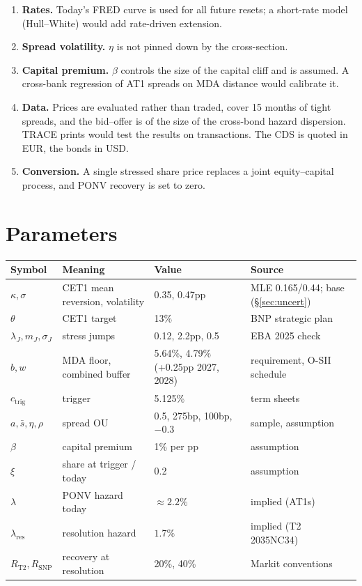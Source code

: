 \documentclass[11pt]{article}
\newcommand{\1}{\mathbf{1}}
\newcommand{\ctrig}{c_{\mathrm{trig}}}
\begin{document}
\begin{enumerate}
  sector/sovereign factor with co-jumps is the main extension.
  \item \textbf{Rates.} Today's FRED curve is used for all future resets; a
  short-rate model (Hull--White) would add rate-driven extension.
  \item \textbf{Spread volatility.} $\eta$ is not pinned down by the cross-section.
  \item \textbf{Capital premium.} $\beta$ controls the size of the capital cliff
  and is assumed. A cross-bank regression of AT1 spreads on MDA distance would
  calibrate it.
  \item \textbf{Data.} Prices are evaluated rather than traded, cover 15 months
  of tight spreads, and the bid--offer is of the size of the cross-bond hazard
  dispersion. TRACE prints would test the results on transactions. The CDS is
  quoted in EUR, the bonds in USD.
  \item \textbf{Conversion.} A single stressed share price replaces a joint
  equity--capital process, and PONV recovery is set to zero.
\end{enumerate}

\appendix
\section{Parameters}
\begin{center}
\small
\begin{tabular}{llll}
\toprule
Symbol & Meaning & Value & Source \\
\midrule
$\kappa,\sigma$ & CET1 mean reversion, volatility & 0.35, 0.47pp & MLE 0.165/0.44; base (\S\ref{sec:uncert}) \\
$\theta$ & CET1 target & 13\% & BNP strategic plan \\
$\lambda_J, m_J, \sigma_J$ & stress jumps & 0.12, 2.2pp, 0.5 & EBA 2025 check \\
$b, w$ & MDA floor, combined buffer & 5.64\%, 4.79\% (+0.25pp 2027, 2028) & requirement, O-SII schedule \\
$\ctrig$ & trigger & 5.125\% & term sheets \\
$a, \bar s, \eta, \rho$ & spread OU & 0.5, 275bp, 100bp, $-0.3$ & sample, assumption \\
$\beta$ & capital premium & 1\% per pp & assumption \\
$\xi$ & share at trigger / today & 0.2 & assumption \\
$\lambda$ & PONV hazard today & $\approx2.2\%$ & implied (AT1s) \\
$\lambda_{\mathrm{res}}$ & resolution hazard & $1.7\%$ & implied (T2 2035NC34) \\
$R_{\mathrm{T2}}, R_{\mathrm{SNP}}$ & recovery at resolution & 20\%, 40\% & Markit conventions \\
\bottomrule
\end{tabular}
\end{center}
\end{document}
